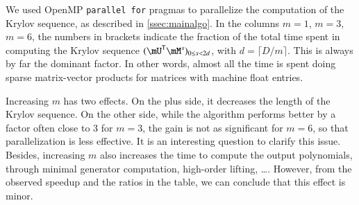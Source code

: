\documentclass[final,1p,times,authoryear]{elsarticle}
\newcommand{\trsp}[1]{#1^{\mathsf{T}}} %
\newcommand{\mUt}{\trsp{\mU}}
\begin{document}
We used OpenMP {\tt parallel
for} pragmas to parallelize the computation of the Krylov sequence,
as described in \cref{ssec:mainalgo}.
In the columns $m=1$, $m=3$, $m=6$, the numbers in brackets indicate the
fraction of the total time spent in computing the Krylov sequence
$(\mUt \mM^s)_{0 \le s< 2d}$, with $d=\lceil D/m\rceil$. This is
always by far the dominant factor.  In other words, almost all the time is
spent doing sparse matrix-vector products for matrices with machine float
entries. 

Increasing $m$ has two effects. On the plus side, it
decreases the length of the Krylov sequence. On the other side, while
the algorithm performs better by a factor often close to 3 for $m=3$,
the gain is not as significant for $m=6$, so that parallelization is
less effective. It is an interesting question to clarify this issue.  Besides, increasing $m$ also increases the time to
compute the output polynomials, through minimal generator computation,
high-order lifting, \dots. However, from the observed speedup and the
ratios in the table, we can conclude that this effect is minor.
\end{document}
